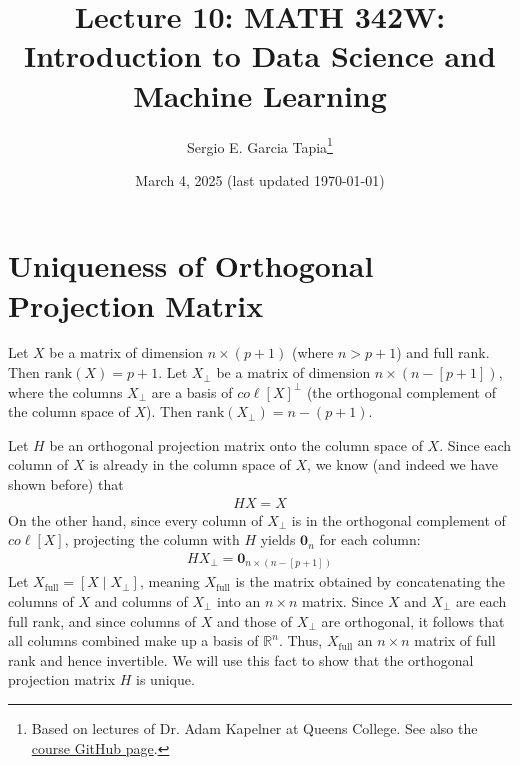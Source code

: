 \documentclass[12pt, a4paper]{article}
\title{Lecture 10: MATH 342W: Introduction to Data Science and Machine Learning}
\author{Sergio E. Garcia Tapia\thanks{Based on lectures of Dr. Adam Kapelner at Queens College.
See also the \href{https://github.com/kapelner/QC_MATH_342W_Spring_2025}{course GitHub page}.}}
\date{March 4, 2025 (last updated \today)}
\theoremstyle{definition}
\begin{document}
	\maketitle
	\section*{Uniqueness of Orthogonal Projection Matrix}
	Let $X$ be a matrix of dimension $n\times (p+1)$ (where $n > p+1$) and full rank.
	Then $\text{rank}(X)=p+1$. Let $X_\perp$ be a matrix of dimension $n\times (n-[p+1])$,
	where the columns $X_\perp$ are a basis of $co\ell[X]^\perp$ (the orthogonal complement
	of the column space of $X$). Then $\text{rank}(X_\perp)=n-(p+1)$.
	
	Let $H$ be an orthogonal projection matrix onto the column space of $X$. Since each
	column of $X$ is already in the column space of $X$, we know (and indeed we have shown
	before) that
	\begin{align*}
		HX=X
	\end{align*}
	On the other hand, since every column of $X_\perp$ is in the orthogonal complement
	of $co\ell [X]$, projecting the column with $H$ yields $\textbf{0}_n$ for each column:
	\begin{align*}
		HX_\perp = \mathbf{0}_{n\times (n-[p+1])}
	\end{align*}
	Let $X_{\text{full}}=[X \mid X_\perp]$, meaning $X_{\text{full}}$ is the matrix obtained
	by concatenating the columns of $X$ and columns of $X_\perp$ into an $n\times n$ matrix.
	Since $X$ and $X_{\perp}$ are each full rank, and since columns of $X$ and those of $X_\perp$
	are orthogonal, it follows that all columns combined make up a basis of $\mathbb{R}^n$.
	Thus, $X_{\text{full}}$ an $n\times n$ matrix of full rank and hence invertible.
	We will use this fact to show that the orthogonal projection matrix $H$ is unique.
\end{document}

